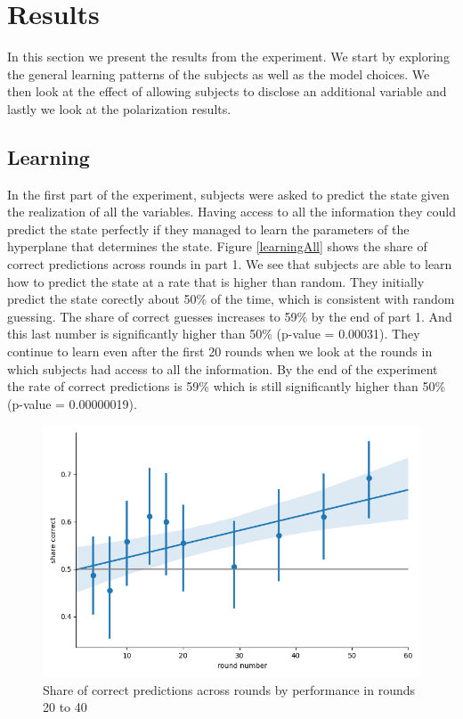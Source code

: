 \documentclass[
  12pt,
]{article}
\begin{document}
\hypertarget{results}{%
\section{Results}\label{results}}

In this section we present the results from the experiment. We start by
exploring the general learning patterns of the subjects as well as the
model choices. We then look at the effect of allowing subjects to
disclose an additional variable and lastly we look at the polarization
results.

\subsection{Learning}

In the first part of the experiment, subjects were asked to predict the
state given the realization of all the variables. Having access to all
the information they could predict the state perfectly if they managed
to learn the parameters of the hyperplane that determines the state.
Figure \ref{learningAll} shows the share of correct predictions across
rounds in part 1. We see that subjects are able to learn how to predict
the state at a rate that is higher than random. They initially predict
the state corectly about 50\% of the time, which is consistent with
random guessing. The share of correct guesses increases to 59\% by the
end of part 1. And this last number is significantly higher than 50\%
(p-value = 0.00031). They continue to learn even after the first 20
rounds when we look at the rounds in which subjects had access to all
the information. By the end of the experiment the rate of correct
predictions is 59\% which is still significantly higher than 50\%
(p-value = 0.00000019).

\begin{figure}

{\centering \includegraphics[width=0.65\linewidth]{../computed_objects/figures/learning_all} 

}

\caption{\label{learningAll} Share of correct predictions across rounds by performance in rounds 20 to 40}\label{fig:learningAll}
\end{figure}
\end{document}
